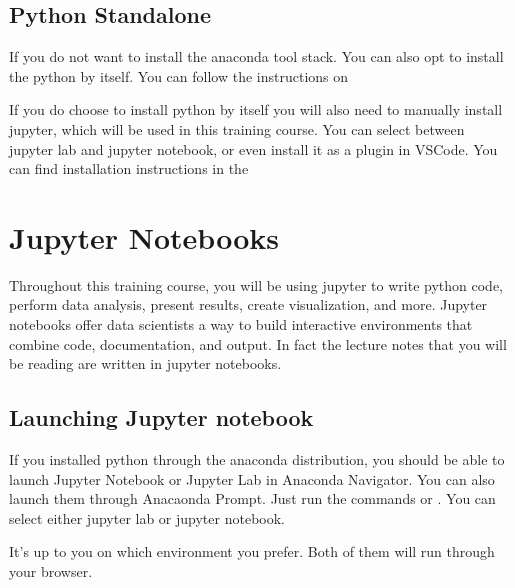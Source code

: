 \documentclass[letterpaper,10pt,english]{jupyterBook}
\begin{document}
\section{Python Standalone}
\label{\detokenize{installing-python:python-standalone}}
\sphinxAtStartPar
If you do not want to install the anaconda tool stack. You can also opt to install the python by itself.
You can follow the instructions on 

\sphinxAtStartPar
If you do choose to install python by itself you will also need to manually install jupyter, which will be used in this training course. You can select between jupyter lab and jupyter notebook, or even install it as a plugin in VSCode. You can find installation instructions in the 

\sphinxstepscope


\chapter{Jupyter Notebooks}
\label{\detokenize{jupyter-notebooks:jupyter-notebooks}}\label{\detokenize{jupyter-notebooks::doc}}
\sphinxAtStartPar
Throughout this training course, you will be using jupyter to write python code, perform data analysis, present results, create visualization, and more.
Jupyter notebooks offer data scientists a way to build interactive environments that combine code, documentation, and output. In fact the lecture notes that you will be reading are written in jupyter notebooks.


\section{Launching Jupyter notebook}
\label{\detokenize{jupyter-notebooks:launching-jupyter-notebook}}
\sphinxAtStartPar
If you installed python through the anaconda distribution, you should be able to launch Jupyter Notebook or Jupyter Lab in Anaconda Navigator.
You can also launch them through Anacaonda Prompt. Just run the commands  or . You can select either jupyter lab or jupyter notebook.

\sphinxAtStartPar
{}

\sphinxAtStartPar
It’s up to you on which environment you prefer. Both of them will run through your browser.
\end{document}
